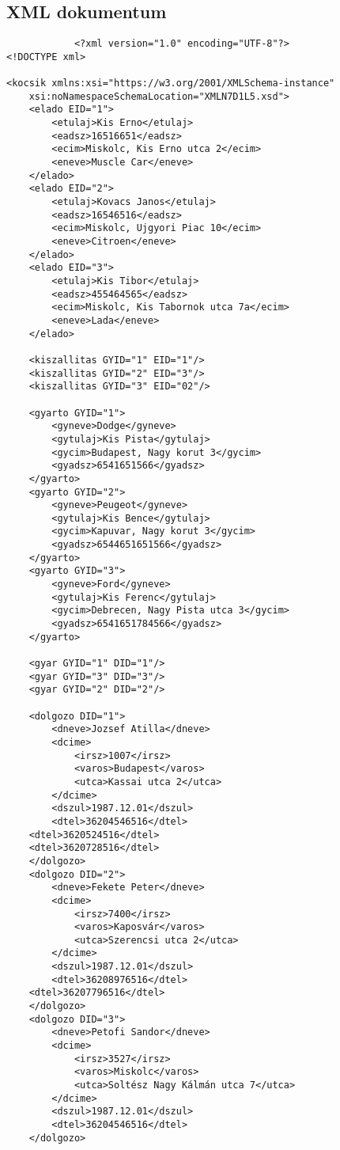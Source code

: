 \documentclass[14pt]{extarticle}
\begin{document}
\begin{normalsize}
		\section{XML dokumentum}
		\begin{verbatim}
			<?xml version="1.0" encoding="UTF-8"?>
<!DOCTYPE xml>

<kocsik xmlns:xsi="https://w3.org/2001/XMLSchema-instance" 
	xsi:noNamespaceSchemaLocation="XMLN7D1L5.xsd">
    <elado EID="1">
        <etulaj>Kis Erno</etulaj>
        <eadsz>16516651</eadsz>
        <ecim>Miskolc, Kis Erno utca 2</ecim>
        <eneve>Muscle Car</eneve>
    </elado>
    <elado EID="2">
        <etulaj>Kovacs Janos</etulaj>
        <eadsz>16546516</eadsz>
        <ecim>Miskolc, Ujgyori Piac 10</ecim>
        <eneve>Citroen</eneve>
    </elado>
    <elado EID="3">
        <etulaj>Kis Tibor</etulaj>
        <eadsz>455464565</eadsz>
        <ecim>Miskolc, Kis Tabornok utca 7a</ecim>
        <eneve>Lada</eneve>
    </elado>

    <kiszallitas GYID="1" EID="1"/>
    <kiszallitas GYID="2" EID="3"/>
    <kiszallitas GYID="3" EID="02"/>

    <gyarto GYID="1">
        <gyneve>Dodge</gyneve>
        <gytulaj>Kis Pista</gytulaj>
        <gycim>Budapest, Nagy korut 3</gycim>
        <gyadsz>6541651566</gyadsz>
    </gyarto>
    <gyarto GYID="2">
        <gyneve>Peugeot</gyneve>
        <gytulaj>Kis Bence</gytulaj>
        <gycim>Kapuvar, Nagy korut 3</gycim>
        <gyadsz>6544651651566</gyadsz>
    </gyarto>
    <gyarto GYID="3">
        <gyneve>Ford</gyneve>
        <gytulaj>Kis Ferenc</gytulaj>
        <gycim>Debrecen, Nagy Pista utca 3</gycim>
        <gyadsz>6541651784566</gyadsz>
    </gyarto>

    <gyar GYID="1" DID="1"/>
    <gyar GYID="3" DID="3"/>
    <gyar GYID="2" DID="2"/>

    <dolgozo DID="1">
        <dneve>Jozsef Atilla</dneve>
        <dcime>
            <irsz>1007</irsz>
            <varos>Budapest</varos>
            <utca>Kassai utca 2</utca>
        </dcime>
        <dszul>1987.12.01</dszul>
        <dtel>36204546516</dtel>
	<dtel>3620524516</dtel>
	<dtel>3620728516</dtel>
    </dolgozo>
    <dolgozo DID="2">
        <dneve>Fekete Peter</dneve>
        <dcime>
            <irsz>7400</irsz>
            <varos>Kaposvár</varos>
            <utca>Szerencsi utca 2</utca>
        </dcime>
        <dszul>1987.12.01</dszul>
        <dtel>36208976516</dtel>
	<dtel>36207796516</dtel>
    </dolgozo>
    <dolgozo DID="3">
        <dneve>Petofi Sandor</dneve>
        <dcime>
            <irsz>3527</irsz>
            <varos>Miskolc</varos>
            <utca>Soltész Nagy Kálmán utca 7</utca>
        </dcime>
        <dszul>1987.12.01</dszul>
        <dtel>36204546516</dtel>
    </dolgozo>


\end{verbatim}
\end{normalsize}
\end{document}
